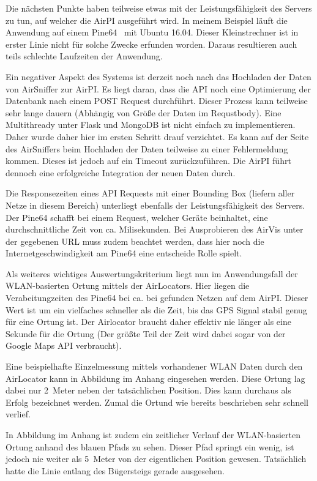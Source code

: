 \documentclass[11pt,a4paper]{article}
\begin{document}
Die nächsten Punkte haben teilweise etwas mit der Leistungsfähigkeit des Servers zu tun, auf welcher die AirPI ausgeführt wird. In meinem Beispiel läuft die Anwendung auf einem Pine64~\cite{pine64} mit Ubuntu 16.04. Dieser Kleinstrechner ist in erster Linie nicht für solche Zwecke erfunden worden. Daraus resultieren auch teils schlechte Laufzeiten der Anwendung.

Ein negativer Aspekt des Systems ist derzeit noch nach das Hochladen der Daten von AirSniffer zur AirPI. Es liegt daran, dass die API noch eine Optimierung der Datenbank nach einem POST Request durchführt. Dieser Prozess kann teilweise sehr lange dauern (Abhängig von Größe der Daten im Requstbody). Eine Multithready unter Flask und MongoDB ist nicht einfach zu implementieren. Daher wurde daher hier im ersten Schritt drauf verzichtet. Es kann auf der Seite des AirSniffers beim Hochladen der Daten teilweise zu einer Fehlermeldung kommen. Dieses ist jedoch auf ein Timeout zurückzuführen. Die AirPI führt dennoch eine erfolgreiche Integration der neuen Daten durch.

Die Responsezeiten eines API Requests mit einer Bounding Box (liefern aller Netze in diesem Bereich) unterliegt ebenfalls der Leistungsfähigkeit des Servers. Der Pine64 schafft bei einem Request, welcher 
Geräte beinhaltet, eine durchschnittliche Zeit von ca. 
Milisekunden. Bei Ausprobieren des AirVis unter der gegebenen URL muss zudem beachtet werden, dass hier noch die Internetgeschwindigkeit am Pine64 eine entscheide Rolle spielt.

Als weiteres wichtiges Auswertungskriterium liegt nun im Anwendungsfall der WLAN-basierten Ortung mittels der AirLocators. Hier liegen die Verabeitungzeiten des Pine64 bei ca.
bei 
gefunden Netzen auf dem AirPI. Dieser Wert ist um ein vielfaches schneller als die Zeit, bis das GPS Signal stabil genug für eine Ortung ist. Der Airlocator braucht daher effektiv nie länger als eine Sekunde für die Ortung (Der größte Teil der Zeit wird dabei sogar von der Google Maps API verbraucht).

Eine beispielhafte Einzelmessung mittels vorhandener WLAN Daten durch den AirLocator kann in Abbildung 
im Anhang eingesehen werden. Diese Ortung lag dabei nur 2~Meter neben der tatsächlichen Position. Dies kann durchaus als Erfolg bezeichnet werden. Zumal die Ortund wie bereits beschrieben sehr schnell verlief.

In Abbildung
im Anhang ist zudem ein zeitlicher Verlauf der WLAN-basierten Ortung anhand des blauen Pfads zu sehen. Dieser Pfad springt ein wenig, ist jedoch nie weiter als 5~Meter von der eigentlichen Position gewesen. Tatsächlich hatte die Linie entlang des Bügersteigs gerade ausgesehen.
\end{document}
